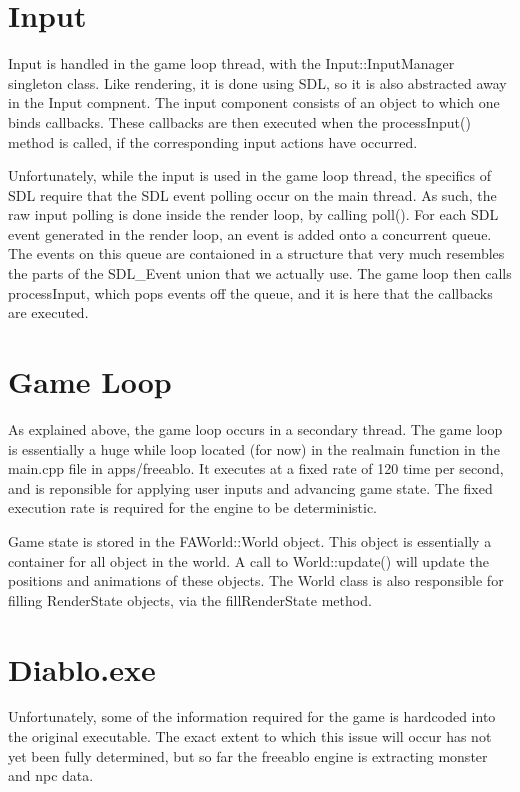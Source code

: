     \section{Input}
    Input is handled in the game loop thread, with the Input::InputManager singleton class. Like rendering, it is done using SDL, so it is also abstracted away in the Input compnent.
    The input component consists of an object to which one binds callbacks. These callbacks are then executed when the processInput() method is called, if the corresponding input actions have occurred.
  	
  	Unfortunately, while the input is used in the game loop thread, the specifics of SDL require that the SDL event polling occur on the main thread. As such, the raw input polling is done inside the render loop, by calling poll(). 
  	For each SDL event generated in the render loop, an event is added onto a concurrent queue. The events on this queue are contaioned in a structure that very much resembles the parts of the SDL\_Event union that we actually use.
  	The game loop then calls processInput, which pops events off the queue, and it is here that the callbacks are executed.

\section{Game Loop}
	As explained above, the game loop occurs in a secondary thread. The game loop is essentially a huge while loop  located (for now) in the realmain function in the main.cpp file in apps/freeablo.
	It executes at a fixed rate of 120 time per second, and is reponsible for applying user inputs and advancing game state. The fixed execution rate is required for the engine to be deterministic.
	
	Game state is stored in the FAWorld::World object. This object is essentially a container for all object in the world. A call to World::update() will update the positions and animations of these objects.
	The World class is also responsible for filling RenderState objects, via the fillRenderState method.
	
\section{Diablo.exe}
	Unfortunately, some of the information required for the game is hardcoded into the original executable.
	The exact extent to which this issue will occur has not yet been fully determined, but so far the freeablo engine is extracting monster and npc data.
	
